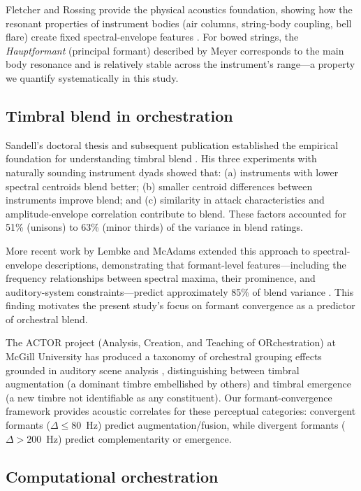 \documentclass[12pt,a4paper]{article}
\begin{document}
Fletcher and Rossing provide the physical acoustics foundation, showing how the
resonant properties of instrument bodies (air columns, string-body coupling,
bell flare) create fixed spectral-envelope features \citep{Fletcher1998}. For
bowed strings, the \emph{Hauptformant} (principal formant) described by Meyer
corresponds to the main body resonance and is relatively stable across the
instrument's range---a property we quantify systematically in this study.

\subsection{Timbral blend in orchestration}

Sandell's doctoral thesis and subsequent publication established the empirical
foundation for understanding timbral blend \citep{Sandell1991,Sandell1995}.
His three experiments with naturally sounding instrument dyads showed that: (a)
instruments with lower spectral centroids blend better; (b) smaller centroid
differences between instruments improve blend; and (c) similarity in attack
characteristics and amplitude-envelope correlation contribute to blend. These
factors accounted for 51\% (unisons) to 63\% (minor thirds) of the variance in
blend ratings.

More recent work by Lembke and McAdams extended this approach to spectral-envelope
descriptions, demonstrating that formant-level features---including the frequency
relationships between spectral maxima, their prominence, and auditory-system
constraints---predict approximately 85\% of blend variance
\citep{Lembke2015,Lembke2017}. This finding motivates the present study's focus
on formant convergence as a predictor of orchestral blend.

The ACTOR project (Analysis, Creation, and Teaching of ORchestration) at McGill
University has produced a taxonomy of orchestral grouping effects grounded in
auditory scene analysis \citep{Goodchild2018,McAdams2022}, distinguishing between
timbral augmentation (a dominant timbre embellished by others) and timbral
emergence (a new timbre not identifiable as any constituent). Our formant-convergence
framework provides acoustic correlates for these perceptual categories: convergent
formants ($\Delta \leq 80$~Hz) predict augmentation/fusion, while divergent
formants ($\Delta > 200$~Hz) predict complementarity or emergence.

\subsection{Computational orchestration}
\end{document}
